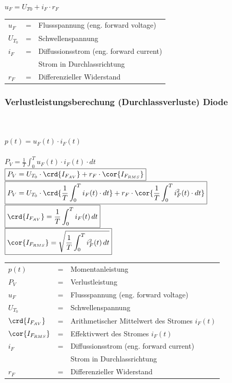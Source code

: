 $\boxed{u_F = U_{T0} + i_F \cdot r_F }$\\

\begin{tabular}{lll}
    $u_{F}$ &=& Flussspannung (eng. forward voltage)\\

    $U_{T_0}$ &=& Schwellenspannung\\
    $i_{F}$ &=& Diffussionsstrom (eng. forward current)\\
            & & Strom in Durchlassrichtung\\
    $r_{F}$ &=& Differenzieller Widerstand\\
\end{tabular}


\subsubsection{Verlustleistungsberechung (Durchlassverluste) Diode}
\\\\
$\boxed{p(t) = u_F(t) \cdot i_F(t)}$\\

\\

$\boxed{P_V=\frac{1}{T}\int_0^Tu_F(t)\cdot i_F(t)\cdot dt}$\\

$\boxed{P_V = U_{T_0} \cdot \crd{I_{F_{AV}}} + r_F \cdot \cor{I_{F_{RMS}}}}$\\

$\boxed{P_V=U_{T_0} \cdot \crd{\frac{1}{T}\int_0^T i_F(t) \cdot dt} + r_F \cdot \cor{\frac{1}{T}\int_0^Ti_F^2(t)\cdot dt}}$\\

$\boxed{\crd{I_{F_{AV}}} = \frac{1}{T} \int_0^T i_F(t) \, dt}$\\

$\boxed{\cor{I_{F_{RMS}}} = \sqrt{\frac{1}{T} \int_0^T i^2_F(t) \, dt}}$\\

\begin{tabular}{lll}
    $p(t)$ &=& Momentanleistung\\
    $P_V$ &=& Verlustleistung\\
    $u_{F}$ &=& Flussspannung (eng. forward voltage)\\
    $U_{T_0}$ &=& Schwellenspannung\\
    $\crd{I_{F_{AV}}}$ &=& Arithmetischer Mittelwert des Stromes $i_F(t)$\\
    $\cor{I_{F_{RMS}}}$ &=& Effektivwert des Stromes $i_F(t)$\\
    $i_{F}$ &=& Diffussionsstrom (eng. forward current)\\
            & & Strom in Durchlassrichtung\\
    $r_{F}$ &=& Differenzieller Widerstand\\
\end{tabular}


